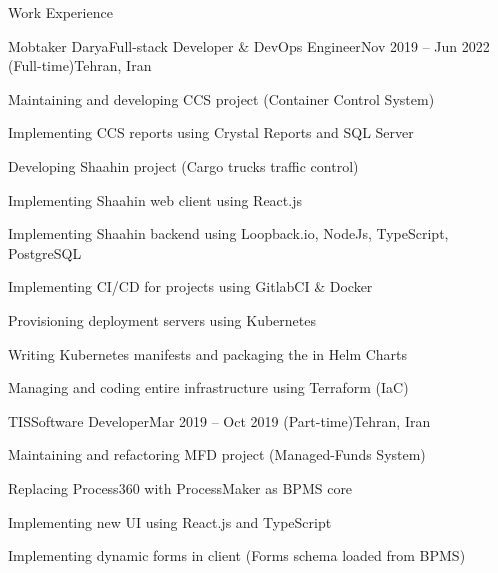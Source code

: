\documentclass[]{main}
\begin{document}
\begin{section}{Work Experience}
 \begin{subsection}{Mobtaker Darya}{Full-stack Developer \& DevOps Engineer}{Nov 2019 -- Jun 2022 (Full-time)}{Tehran, Iran}
     \item Maintaining and developing CCS project (Container Control System)
     \item Implementing CCS reports using Crystal Reports and SQL Server
     \item Developing Shaahin project (Cargo trucks traffic control)
     \item Implementing Shaahin web client using React.js
     \item Implementing Shaahin backend using Loopback.io, NodeJs, TypeScript, PostgreSQL
     \item Implementing CI/CD for projects using GitlabCI \& Docker
     \item Provisioning deployment servers using Kubernetes
     \item Writing Kubernetes manifests and packaging the in Helm Charts
     \item Managing and coding entire infrastructure using Terraform (IaC)
 \end{subsection}
 \begin{subsection}{TIS}{Software Developer}{Mar 2019 -- Oct 2019 (Part-time)}{Tehran, Iran}
     \item Maintaining and refactoring MFD project (Managed-Funds System)
     \item Replacing Process360 with ProcessMaker as BPMS core
     \item Implementing new UI using React.js and TypeScript
     \item Implementing dynamic forms in client (Forms schema loaded from BPMS)
 \end{subsection}
\end{section}

\end{document}

